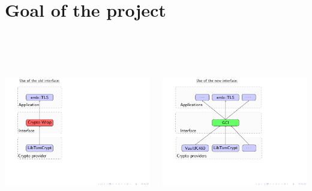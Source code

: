 
\section{Goal of the project}
\begin{frame}




\begin{columns}[t]

\begin{column}{0.375\textwidth}

%
\includegraphics[trim=1cm 1cm 14cm 0cm, height=8cm]{figures/intro_cw.pdf}


\end{column}

\begin{column}{0.725\textwidth}

%
\includegraphics[trim=0.5cm 1cm 14cm 0cm, height=8cm]{figures/intro_gci.pdf}

\end{column}

\end{columns}

\end{frame}

